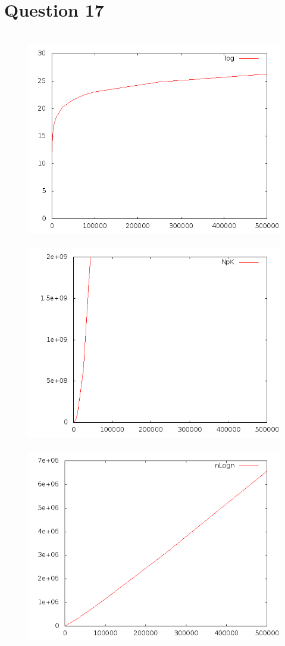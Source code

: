 \documentclass[a4paper,12pt]{report}
\begin{document}
\section*{Question 17}
\begin{figure}[!ht]
	\hbox{ 
     	\hspace*{1cm}
		\includegraphics[scale=0.3]{q161.png}
     	\hspace*{1cm}
		\includegraphics[scale=0.3]{q162.png}
	}
	\hbox{ 
     	\hspace*{1cm}
		\includegraphics[scale=0.3]{q163.png}
}
\end{figure}
\end{document}
